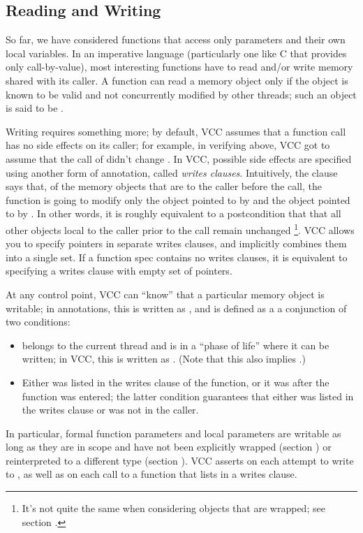 \subsection*{Reading and Writing}
\label{sect:writes}

So far, we have considered functions that access only parameters and
their own local variables. In an imperative language (particularly one
like C that provides only call-by-value), most interesting functions
have to read and/or write memory shared with its caller. A function
can read a memory object only if the object is known to be valid and
not concurrently modified by other threads; such an object is said to
be . 

Writing requires something more; by default, VCC assumes that a
function call has no side effects on its caller; for example, in
verifying  above, VCC got to assume that the call of
 didn't change . 
In VCC, possible side effects are specified using 
another form of annotation, called \emph{writes clauses}.
Intuitively, the clause  says that, 
of the memory objects that are  to the caller before the call,
the function is going to modify only the object pointed to by 
and the object pointed to by .
In other words, it is roughly equivalent to a postcondition that \vcc{\ensures}
that all other objects local to the caller prior
to the call remain unchanged%
\footnote{It's not quite the same when considering objects that are
  wrapped; see section .}.  VCC allows you
to specify pointers in separate writes clauses, and implicitly
combines them into a single set. If a function spec contains no writes clauses, 
it is equivalent to specifying a writes clause with empty set of
pointers.

At any control point, VCC can ``know'' that a particular memory object
 is writable; in annotations, this is written as
, and is defined as a a conjunction of two conditions:
\begin{itemize}
\item {} belongs to the current thread and is in a ``phase of
  life'' where it can be written; in VCC, this is written as 
  . (Note that this also implies .)
\item Either  was listed in the writes clause of the function,
  or it was \vcc{\unwrapped} after the function was entered; the 
  latter condition guarantees that either  was listed in the
  writes clause or was not  in the caller.
\end{itemize}
In particular, formal function parameters and local parameters are
writable as long as they are in scope and have not been explicitly
wrapped (section ) or reinterpreted to a
different type (section ).  VCC asserts
 on each attempt to write to , as well as on
each call to a function that lists  in a writes clause.

